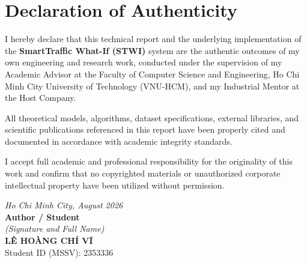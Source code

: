 \chapter*{Declaration of Authenticity}

\noindent I hereby declare that this technical report and the underlying implementation of the \textbf{SmartTraffic What-If (STWI)} system are the authentic outcomes of my own engineering and research work, conducted under the supervision of my Academic Advisor at the Faculty of Computer Science and Engineering, Ho Chi Minh City University of Technology (VNU-HCM), and my Industrial Mentor at the Host Company.

\vspace{0.3cm}
\noindent All theoretical models, algorithms, dataset specifications, external libraries, and scientific publications referenced in this report have been properly cited and documented in accordance with academic integrity standards. 

\vspace{0.3cm}
\noindent I accept full academic and professional responsibility for the originality of this work and confirm that no copyrighted materials or unauthorized corporate intellectual property have been utilized without permission.

\vspace{1.8cm}

\begin{flushright}
\begin{minipage}{0.5\textwidth}
\centering
\textit{Ho Chi Minh City, August 2026}\\[0.2cm]
\textbf{Author / Student}\\[0.1cm]
\textit{(Signature and Full Name)}\\[2.8cm]
\textbf{LÊ HOÀNG CHÍ VĨ}\\
Student ID (MSSV): 2353336
\end{minipage}
\end{flushright}
